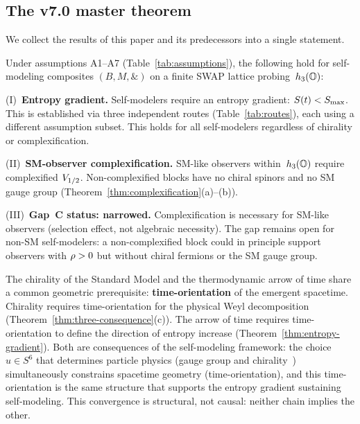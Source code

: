 \subsection{The v7.0 master theorem}\label{sec:master-theorem}

We collect the results of this paper and its predecessors into a
single statement.

\begin{theorem}
\label{thm:master}
Under assumptions A1--A7 \textup{(Table~\ref{tab:assumptions})},
the following hold for self-modeling composites
$(B,M,\mathbin{\&})$ on a finite SWAP lattice probing~$h_3(\mathbb{O})$:

\smallskip\noindent
\textup{(I)~\textbf{Entropy gradient.}}\enspace
Self-modelers require an entropy gradient: $S(t) < S_{\max}$.
This is established via three independent routes
\textup{(Table~\ref{tab:routes})}, each using a different assumption
subset.  This holds for all self-modelers regardless of chirality
or complexification.

\smallskip\noindent
\textup{(II)~\textbf{SM-observer complexification.}}\enspace
SM-like observers within~$h_3(\mathbb{O})$ require complexified $V_{1/2}$.
Non-complexified blocks have no chiral spinors and no SM gauge
group \textup{(}Theorem~\ref{thm:complexification}(a)--(b)\textup{)}.

\smallskip\noindent
\textup{(III)~\textbf{Gap~C status: narrowed.}}\enspace
Complexification is necessary for SM-like observers
\textup{(}selection effect, not algebraic necessity\textup{)}.
The gap remains open for non-SM self-modelers: a non-complexified
block could in principle support observers with $\rho > 0$ but
without chiral fermions or the SM gauge group.
\end{theorem}

\begin{corollary}
\label{cor:nexus}
The chirality of the Standard Model and the thermodynamic arrow of
time share a common geometric prerequisite:
\textbf{time-orientation} of the emergent spacetime.
Chirality requires time-orientation for the physical Weyl
decomposition
\textup{(Theorem~\ref{thm:three-consequence}(c))}.
The arrow of time requires time-orientation to define the direction
of entropy increase
\textup{(Theorem~\ref{thm:entropy-gradient})}.
Both are consequences of the self-modeling framework: the choice
$u \in S^6$ that determines particle physics
\textup{(}gauge group and chirality~\cite{Paper7}\textup{)}
simultaneously constrains spacetime geometry
\textup{(}time-orientation\textup{)}, and this time-orientation is
the same structure that supports the entropy gradient sustaining
self-modeling.  This convergence is structural, not causal: neither
chain implies the other.
\end{corollary}

